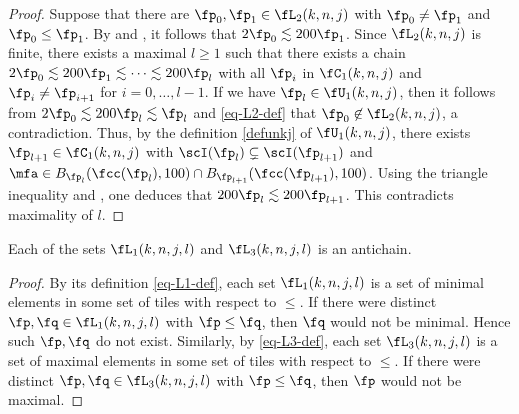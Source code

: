 \begin{proof}
    \leanok
    Suppose that there are $\fp_0, \fp_1 \in \fL_2(k,n,j)$ with $\fp_0 \ne \fp_1$ and $\fp_0 \le \fp_1$. By  and , it follows that $2\fp_0 \lesssim 200\fp_1$. Since $\fL_2(k,n,j)$ is finite, there exists a maximal $l \ge 1$ such that there exists a chain $2\fp_0 \lesssim 200 \fp_1 \lesssim \dotsb \lesssim 200 \fp_l$ with all $\fp_i$ in $\fC_1(k,n,j)$ and $\fp_i \ne \fp_{i+1}$ for $i = 0, \dotsc, l-1$.
    If we have $\fp_l \in \fU_1(k,n,j)$, then it follows from $2\fp_0 \lesssim 200 \fp_l \lesssim \fp_l$ and \eqref{eq-L2-def} that $\fp_0 \not\in \fL_2(k,n,j)$, a contradiction. Thus, by the definition \eqref{defunkj} of $\fU_1(k,n,j)$, there exists $\fp_{l+1} \in \fC_1(k,n,j)$ with $\scI(\fp_l) \subsetneq \scI(\fp_{l+1}) $ and $\mfa \in B_{\fp_l}(\fcc(\fp_l), 100) \cap B_{\fp_{l+1}}(\fcc(\fp_{l+1}), 100)$. Using the triangle inequality and , one deduces that $200 \fp_l \lesssim 200\fp_{l+1}$. This contradicts maximality of $l$.
\end{proof}

\begin{lemma}[L1 L3 antichain]
\label{L1-L3-antichain}
\leanok
{}
    Each of the sets $\fL_1(k,n,j,l)$ and $\fL_3(k,n,j,l)$ is an antichain.
\end{lemma}

\begin{proof}
    \leanok
    By its definition \eqref{eq-L1-def}, each set $\fL_1(k,n,j,l)$ is a set of minimal elements in some set of tiles with respect to $\le$. If there were distinct $\fp, \fq \in \fL_1(k,n,j,l)$ with $\fp \le \fq$, then $\fq$ would not be minimal. Hence such $\fp, \fq$ do not exist. Similarly, by \eqref{eq-L3-def}, each set $\fL_3(k,n,j,l)$ is a set of maximal elements in some set of tiles with respect to $\le$. If there were distinct $\fp, \fq \in \fL_3(k,n,j,l)$ with $\fp \le \fq$, then $\fp$ would not be maximal.
\end{proof}

